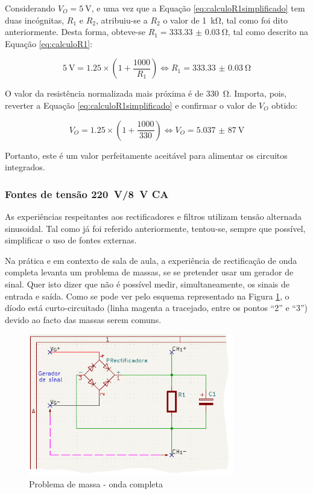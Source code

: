 Considerando $V_{O} = \SI{5}{\volt}$, e uma vez que a Equação \ref{eq:calculoR1simplificado} tem duas incógnitas, $R_{1}$ e $R_{2}$, atribuiu-se a $R_{2}$ o valor de \SI{1}{\kilo\ohm}, tal como foi dito anteriormente. Desta forma, obteve-se $R_{1} = \SI{333.33(3)}{\ohm}$, tal como descrito na Equação \ref{eq:calculoR1}: 

\begin{equation} \label{eq:calculoR1}
	\SI{5}{\volt} = 1.25 \times (1 + \frac{1000}{R_{1}}) \Leftrightarrow R_{1} = \SI{333.33(3)}{\ohm}
\end{equation}

O valor da resistência normalizada mais próxima é de \SI{330}{\ohm}. Importa, pois, reverter a Equação \ref{eq:calculoR1simplificado} e confirmar o valor de  $V_{O}$ obtido:

\begin{equation} \label{eq:confirmacaoVout}
	V_{O} = 1.25 \times (1 + \frac{1000}{330}) \Leftrightarrow V_{O} = \SI{5,037(87)}{\volt}
\end{equation}

Portanto, este é um valor perfeitamente aceitável para alimentar os circuitos integrados.

\subsubsection{Fontes de tensão \SI{220}{\volt}/\SI{8}{\volt} CA}
As experiências respeitantes aos rectificadores e filtros utilizam tensão alternada sinusoidal. Tal como já foi referido anteriormente, tentou-se, sempre que possível, simplificar o uso de fontes externas. 

Na prática e em contexto de sala de aula, a experiência de rectificação de onda completa levanta um problema de massas, se se pretender usar um gerador de sinal. Quer isto dizer que não é possível medir, simultaneamente, os sinais de entrada e saída. Como se pode ver pelo esquema representado na Figura \ref{fig:gerador-massa}, o díodo está curto-circuitado (linha magenta a tracejado, entre os pontos ``2'' e ``3'') devido ao facto das massas serem comuns. 

\begin{figure}[hbtp]
	\centering
	\includegraphics[width=0.8\textwidth]{figures/sch_completa_CC.png}
	\caption{Problema de massa - onda completa}
	\label{fig:gerador-massa}
\end{figure}

